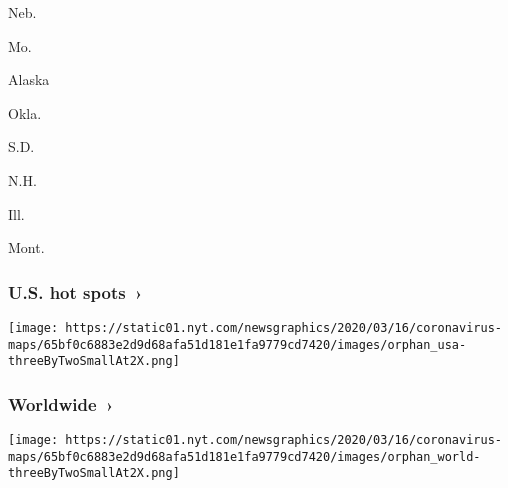 \href{https://www.nytimes.com/interactive/2020/us/nebraska-coronavirus-cases.html}{}

Neb.

\href{https://www.nytimes.com/interactive/2020/us/missouri-coronavirus-cases.html}{}

Mo.

\href{https://www.nytimes.com/interactive/2020/us/alaska-coronavirus-cases.html}{}

Alaska

\href{https://www.nytimes.com/interactive/2020/us/oklahoma-coronavirus-cases.html}{}

Okla.

\href{https://www.nytimes.com/interactive/2020/us/south-dakota-coronavirus-cases.html}{}

S.D.

\href{https://www.nytimes.com/interactive/2020/us/new-hampshire-coronavirus-cases.html}{}

N.H.

\href{https://www.nytimes.com/interactive/2020/us/illinois-coronavirus-cases.html}{}

Ill.

\href{https://www.nytimes.com/interactive/2020/us/montana-coronavirus-cases.html}{}

Mont.

\href{https://www.nytimes.com/interactive/2020/us/coronavirus-us-cases.html}{}

\hypertarget{us-hot-spots-}{%
\subsubsection{U.S. hot spots~›}\label{us-hot-spots-}}

\texttt{[image: https://static01.nyt.com/newsgraphics/2020/03/16/coronavirus-maps/65bf0c6883e2d9d68afa51d181e1fa9779cd7420/images/orphan\_usa-threeByTwoSmallAt2X.png]}

\href{https://www.nytimes.com/interactive/2020/world/coronavirus-maps.html}{}

\hypertarget{worldwide-}{%
\subsubsection{Worldwide~›}\label{worldwide-}}

\texttt{[image: https://static01.nyt.com/newsgraphics/2020/03/16/coronavirus-maps/65bf0c6883e2d9d68afa51d181e1fa9779cd7420/images/orphan\_world-threeByTwoSmallAt2X.png]}

